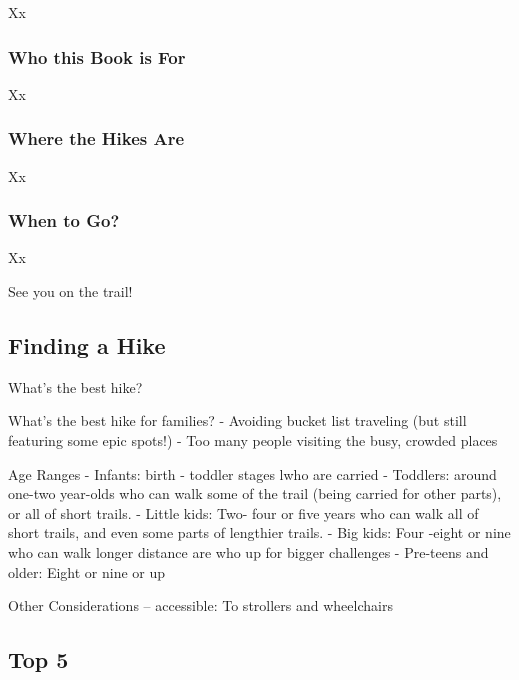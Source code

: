 \documentclass[
  letterpaper,
  DIV=11,
  numbers=noendperiod]{scrartcl}
\begin{document}
Xx

\hypertarget{who-this-book-is-for}{%
\subsubsection{Who this Book is For}\label{who-this-book-is-for}}

Xx

\hypertarget{where-the-hikes-are}{%
\subsubsection{Where the Hikes Are}\label{where-the-hikes-are}}

Xx

\hypertarget{when-to-go}{%
\subsubsection{When to Go?}\label{when-to-go}}

Xx

See you on the trail!

\newpage{}

\hypertarget{finding-a-hike}{%
\subsection{Finding a Hike}\label{finding-a-hike}}

What's the best hike?

What's the best hike for families? - Avoiding bucket list traveling (but
still featuring some epic spots!) - Too many people visiting the busy,
crowded places

Age Ranges - Infants: birth - toddler stages lwho are carried -
Toddlers: around one-two year-olds who can walk some of the trail (being
carried for other parts), or all of short trails. - Little kids: Two-
four or five years who can walk all of short trails, and even some parts
of lengthier trails. - Big kids: Four -eight or nine who can walk longer
distance are who up for bigger challenges - Pre-teens and older: Eight
or nine or up

Other Considerations -- accessible: To strollers and wheelchairs

\newpage{}

\hypertarget{top-5}{%
\subsection{Top 5}\label{top-5}}
\end{document}
